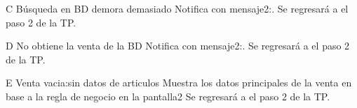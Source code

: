 \begin{UCtrayectoriaA}{C}{ Búsqueda en BD demora demasiado}
	\UCpaso [\UCsist] Notifica con mensaje2:.
	\UCpaso [\UCsist] Se regresará a el paso 2 de la TP.
\end{UCtrayectoriaA}
\begin{UCtrayectoriaA}{D}{ No obtiene la venta de la BD}
	\UCpaso [\UCsist] Notifica con mensaje2:.
	\UCpaso [\UCsist] Se regresará a el paso 2 de la TP.
\end{UCtrayectoriaA}

\begin{UCtrayectoriaA}{E}{ Venta vacia:sin datos de articulos}
	\UCpaso [\UCsist] Muestra los datos principales de la venta en base a la regla de negocio  en la pantalla2  
	\UCpaso [\UCsist] Se regresará a el paso 2 de la TP.
\end{UCtrayectoriaA}